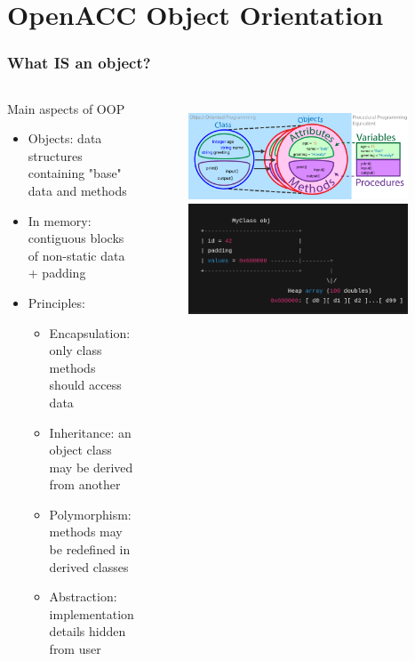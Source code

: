 \section{OpenACC Object Orientation}

\begin{frame}
	\frametitle{What IS an object?}
    \begin{columns}
            \begin{block}{Main aspects of OOP}
                \begin{itemize}
                    \item Objects: data structures containing "base" data and methods
                    \item In memory: contiguous blocks of non-static data + padding
                    \item Principles:
                    \begin{itemize}
                        \item Encapsulation: only class methods should access data
                        \item Inheritance: an object class may be derived from another
                        \item Polymorphism: methods may be redefined in derived classes
                        \item Abstraction: implementation details hidden from user
                    \end{itemize}
                \end{itemize}
            \end{block}
        \begin{figure}
            \centering
            \includegraphics[width=0.95\textwidth]{images/oop.png}
            \includegraphics[width=0.95\textwidth]{images/objectLayout.png}
        \end{figure}
    \end{columns}
\end{frame}


